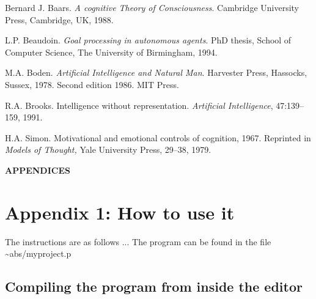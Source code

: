 \begin{description}     %

\item
Bernard J. Baars.
{\em A cognitive Theory of Consciousness}.
Cambridge University Press, Cambridge, UK, 1988.

\item
L.P. Beaudoin.
{\em Goal processing in autonomous agents}.
PhD thesis, School of Computer Science, The University of Birmingham,
1994.

\item
M.A. Boden.
{\em Artificial Intelligence and Natural Man}.
Harvester Press, Hassocks, Sussex, 1978.
Second edition 1986. MIT Press.

\item
R.A. Brooks.
Intelligence without representation.
{\em Artificial Intelligence}, 47:139--159, 1991.

\item
H.A. Simon.
Motivational and emotional controls of cognition, 1967.
Reprinted in {\em Models of Thought,} Yale University Press, 29--38,
  1979.


\end{description}

\newpage

\appendix

\centerline{\Large \bf APPENDICES}


\section{Appendix 1: How to use it}

The instructions are as follows ...
The program can be found in the file \~{}abs/myproject.p


\subsection*{Compiling the program from inside the editor}

